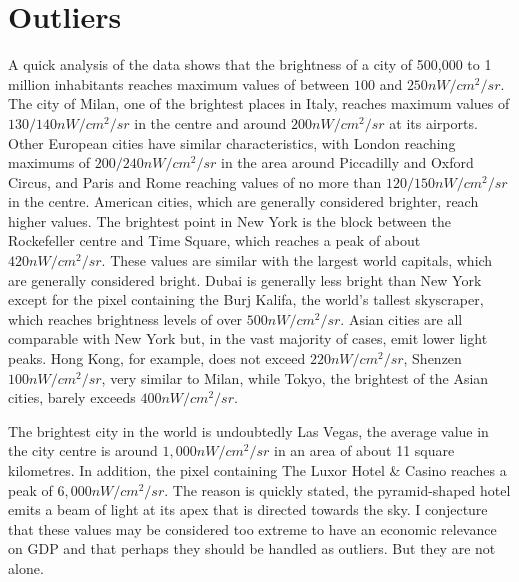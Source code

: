 \section{Outliers} 
A quick analysis of the data shows that the brightness of a city of 500,000 to 1 million inhabitants reaches maximum values of between $100$ and $250nW/cm^2/sr$. The city of Milan, one of the brightest places in Italy, reaches maximum values of $130/140nW/cm^2/sr$ in the centre and around $200nW/cm^2/sr$ at its airports. Other European cities have similar characteristics, with London reaching maximums of $200/240nW/cm^2/sr$ in the area around Piccadilly and Oxford Circus, and Paris and Rome reaching values of no more than $120/150nW/cm^2/sr$ in the centre. American cities, which are generally considered brighter, reach higher values. The brightest point in New York is the block between the Rockefeller centre and Time Square, which reaches a peak of about $420nW/cm^2/sr$. These values are similar with the largest world capitals, which are generally considered bright. Dubai is generally less bright than New York except for the pixel containing the Burj Kalifa, the world's tallest skyscraper, which reaches brightness levels of over $500nW/cm^2/sr$. Asian cities are all comparable with New York but, in the vast majority of cases, emit lower light peaks. Hong Kong, for example, does not exceed $220nW/cm^2/sr$, Shenzen $100nW/cm^2/sr$, very similar to Milan, while Tokyo, the brightest of the Asian cities, barely exceeds $400nW/cm^2/sr$.

The brightest city in the world is undoubtedly Las Vegas, the average value in the city centre is around $1,000nW/cm^2/sr$ in an area of about 11 square kilometres. In addition, the pixel containing The Luxor Hotel & Casino reaches a peak of $6,000nW/cm^2/sr$. The reason is quickly stated, the pyramid-shaped hotel emits a beam of light at its apex that is directed towards the sky. I conjecture that these values may be considered too extreme to have an economic relevance on GDP and that perhaps they should be handled as outliers. But they are not alone.

